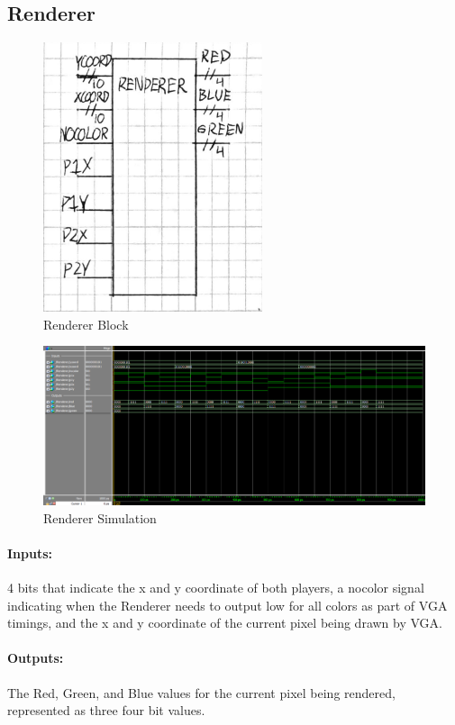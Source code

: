 \documentclass[]{article}
\begin{document}
\subsection{Renderer}
\begin{figure}[H]\centering
    \includegraphics[width=0.5\linewidth]{figures/Renderer_Block.png}
    \caption{Renderer Block}
    \label{fig:rendererBlock}
\end{figure}
\begin{figure}[H]\centering
    \includegraphics[width=\linewidth]{figures/Renderer_Sim.png}
    \caption{Renderer Simulation}
    \label{fig:rendererSim}
\end{figure}
\paragraph{Inputs:} 4 bits that indicate the x and y coordinate of both players, a nocolor signal indicating when the Renderer needs to output low for all colors as part of VGA timings, and the x and y coordinate of the current pixel being drawn by VGA.
\paragraph{Outputs:} The Red, Green, and Blue values for the current pixel being rendered, represented as three four bit values. 
\end{document}
